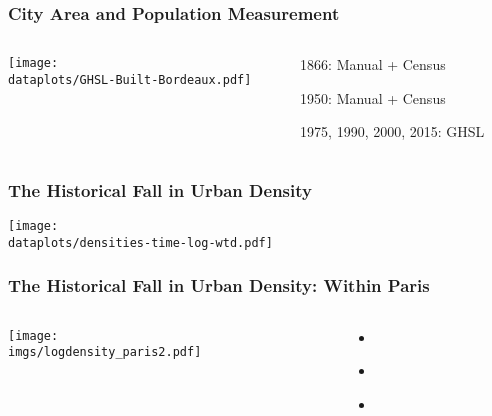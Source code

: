 \documentclass[aspectratio=169]{beamer}
\begin{document}
\begin{frame}
\frametitle{City Area and Population Measurement}
\begin{columns}
\begin{column}{0.7\textwidth}
	\begin{adjustbox}{center}
	\texttt{[image: \\dataplots/GHSL-Built-Bordeaux.pdf]}\end{adjustbox}
	\end{column}
\begin{column}{0.3\textwidth}
\begin{midi}
\item 1866: Manual + Census
\item 1950: Manual + Census
\item 1975, 1990, 2000, 2015: GHSL
\end{midi}
	
\end{column}
\end{columns}
\end{frame}

\begin{frame}[label=density]
\frametitle{The Historical Fall in Urban Density}
\texttt{[image: \\dataplots/densities-time-log-wtd.pdf]}
\end{frame}

\begin{frame}[label=Paris]
	\frametitle{The Historical Fall in Urban Density: Within Paris}
	\begin{columns}
		\begin{column}{0.9\textwidth}
			\texttt{[image: \\imgs/logdensity\_paris2.pdf]}
		\end{column}
		\begin{column}{0.2\textwidth}
		\begin{itemize}
		\item[] \hyperlink{violins}{}
		\item[] \hyperlink{Top5}{}
		\item[] \hyperlink{world_sample_city}{}
		\end{itemize}
		\end{column}
		\end{columns}
\end{frame}
\end{document}
